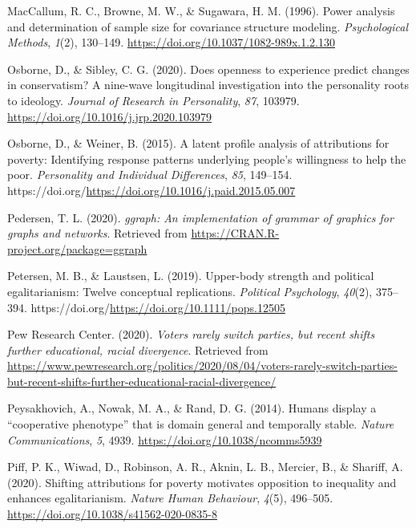 \documentclass[
  man,floatsintext]{apa6}
\newlength{\cslhangindent}
\newlength{\cslentryspacingunit} %
\newenvironment{CSLReferences}[2] %
 {%
  \setlength{\parindent}{0pt}
  \ifodd #1
  \let\oldpar\par
  \def\par{\hangindent=\cslhangindent\oldpar}
  \fi
  \setlength{\parskip}{#2\cslentryspacingunit}
 }%
 {}
\begin{document}
\begin{CSLReferences}{1}{0}
\leavevmode{}%
MacCallum, R. C., Browne, M. W., \& Sugawara, H. M. (1996). Power analysis and determination of sample size for covariance structure modeling. \emph{Psychological Methods}, \emph{1}(2), 130--149. \url{https://doi.org/10.1037/1082-989x.1.2.130}

\leavevmode{}%
Osborne, D., \& Sibley, C. G. (2020). Does openness to experience predict changes in conservatism? A nine-wave longitudinal investigation into the personality roots to ideology. \emph{Journal of Research in Personality}, \emph{87}, 103979. \url{https://doi.org/10.1016/j.jrp.2020.103979}

\leavevmode{}%
Osborne, D., \& Weiner, B. (2015). A latent profile analysis of attributions for poverty: Identifying response patterns underlying people's willingness to help the poor. \emph{Personality and Individual Differences}, \emph{85}, 149--154. https://doi.org/\url{https://doi.org/10.1016/j.paid.2015.05.007}

\leavevmode{}%
Pedersen, T. L. (2020). \emph{{ggraph}: An implementation of grammar of graphics for graphs and networks}. Retrieved from \url{https://CRAN.R-project.org/package=ggraph}

\leavevmode{}%
Petersen, M. B., \& Laustsen, L. (2019). Upper-body strength and political egalitarianism: Twelve conceptual replications. \emph{Political Psychology}, \emph{40}(2), 375--394. https://doi.org/\url{https://doi.org/10.1111/pops.12505}

\leavevmode{}%
Pew Research Center. (2020). \emph{Voters rarely switch parties, but recent shifts further educational, racial divergence}. Retrieved from \url{https://www.pewresearch.org/politics/2020/08/04/voters-rarely-switch-parties-but-recent-shifts-further-educational-racial-divergence/}

\leavevmode{}%
Peysakhovich, A., Nowak, M. A., \& Rand, D. G. (2014). Humans display a {``cooperative phenotype''} that is domain general and temporally stable. \emph{Nature Communications}, \emph{5}, 4939. \url{https://doi.org/10.1038/ncomms5939}

\leavevmode{}%
Piff, P. K., Wiwad, D., Robinson, A. R., Aknin, L. B., Mercier, B., \& Shariff, A. (2020). Shifting attributions for poverty motivates opposition to inequality and enhances egalitarianism. \emph{Nature Human Behaviour}, \emph{4}(5), 496--505. \url{https://doi.org/10.1038/s41562-020-0835-8}


\end{CSLReferences}
\end{document}
